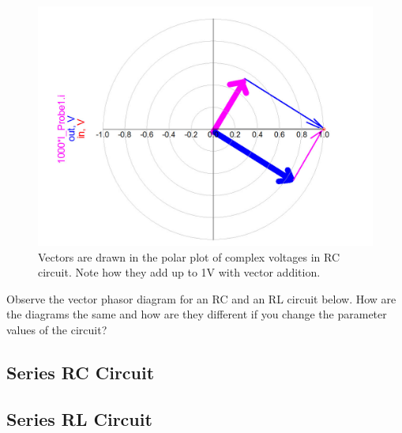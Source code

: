 \documentclass{ximera}
\begin{document}
\begin{example}
\begin{explanation}
\begin{figure}[htbp]
\begin{center}
\includegraphics[scale=0.2]{../jpg/RCvoltPolarPlotVectors.jpg}
\end{center}
\caption{\label{f112} Vectors are drawn in the polar plot of complex voltages in RC circuit. Note how they add up to 1V with vector addition.}
\end{figure}





\end{explanation}



\end{example}

\newpage


\begin{example}
Observe the vector phasor diagram for an RC and an RL circuit below. How are the diagrams the same and how are they different if you change the parameter values of the circuit?
\subsection{Series RC Circuit}
\begin{center}  
\end{center} 

\subsection{Series RL Circuit}
\begin{center}  
\end{center}
\end{example}
\end{document}
